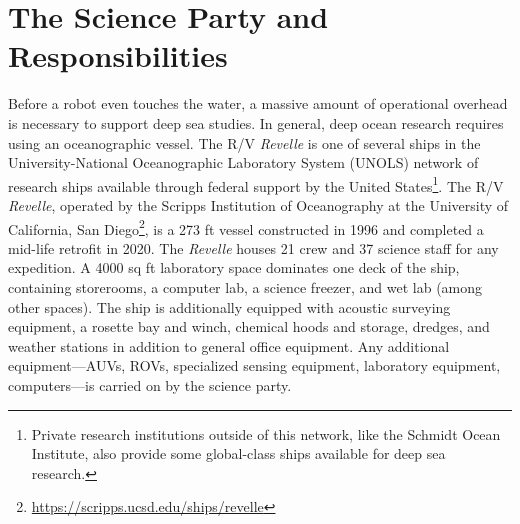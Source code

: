 \section{The Science Party and Responsibilities}
Before a robot even touches the water, a massive amount of operational overhead is necessary to support deep sea studies. In general, deep ocean research requires using an oceanographic vessel. The R/V \emph{Revelle} is one of several ships in the University-National Oceanographic Laboratory System (UNOLS) network of research ships available through federal support by the United States\footnote{Private research institutions outside of this network, like the Schmidt Ocean Institute, also provide some global-class ships available for deep sea research.}. The R/V \emph{Revelle}, operated by the Scripps Institution of Oceanography at the University of California, San Diego\footnote{\url{https://scripps.ucsd.edu/ships/revelle}}, is a 273 ft vessel constructed in 1996 and completed a mid-life retrofit in 2020. The \emph{Revelle} houses 21 crew and 37 science staff for any expedition. A 4000 sq ft laboratory space dominates one deck of the ship, containing storerooms, a computer lab, a science freezer, and wet lab (among other spaces). The ship is additionally equipped with acoustic surveying equipment, a rosette bay and winch, chemical hoods and storage, dredges, and weather stations in addition to general office equipment. Any additional equipment---AUVs, ROVs, specialized sensing equipment, laboratory equipment, computers---is carried on by the science party.

